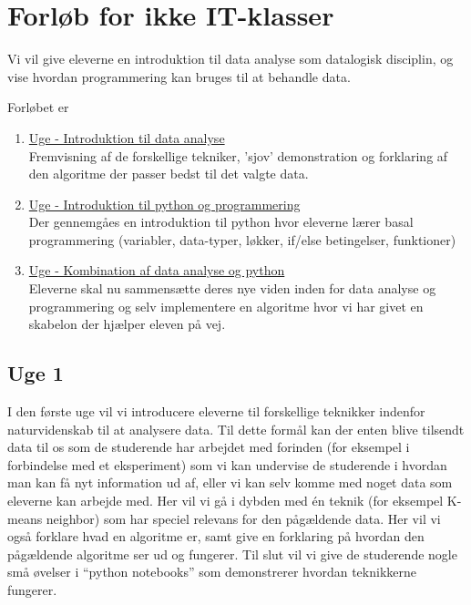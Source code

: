 \documentclass[11pt]{article}
\begin{document}
\section{Forløb for ikke IT-klasser}
 	Vi vil give eleverne en introduktion til data analyse som datalogisk
	disciplin, og vise hvordan programmering kan bruges til at behandle
	data.

    	Forløbet er
    	\begin{enumerate}
        		\item \underline{Uge - Introduktion til data analyse} ~ \\
        		Fremvisning af de forskellige tekniker, 'sjov' demonstration
        		og forklaring af den algoritme der passer bedst til det
        		valgte data.

        		\item \underline{Uge - Introduktion til python og programmering} ~ \\
        		Der gennemgåes en introduktion til python hvor eleverne
        		lærer basal programmering
        		(variabler, data-typer, løkker, if/else betingelser, funktioner)

		\item \underline{Uge - Kombination af data analyse og python} ~ \\
        		Eleverne skal nu sammensætte deres nye viden inden for data
        		analyse og programmering og selv implementere en algoritme
        		hvor vi har givet en skabelon der hjælper eleven på vej.
    \end{enumerate}

    \subsection*{Uge 1}
        I den første uge vil vi introducere eleverne til forskellige teknikker
        indenfor naturvidenskab til at analysere data. Til dette formål kan der
        enten blive tilsendt data til os som de studerende har arbejdet med forinden
        (for eksempel i forbindelse med et eksperiment) som vi kan undervise de
        studerende i hvordan man kan få nyt information ud af,
        eller vi kan selv komme med noget data som eleverne kan arbejde med.
        Her vil vi gå i dybden med én teknik (for eksempel K-means neighbor)
        som har speciel relevans for den pågældende data. Her vil vi også forklare
        hvad en algoritme er, samt give en forklaring på hvordan den
        pågældende algoritme ser ud og fungerer. Til slut vil vi give de
        studerende nogle små øvelser i ``python notebooks'' som demonstrerer
        hvordan teknikkerne fungerer.
\end{document}

